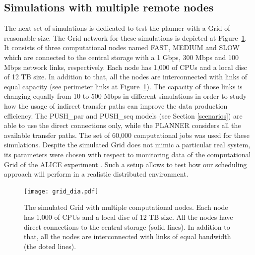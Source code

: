 \documentclass{svjour3}                     %
\begin{document}
\subsection{Simulations with multiple remote nodes}
\label{3nodesSim}
The next set of simulations is dedicated to test the planner with a Grid of reasonable size. The Grid network for these simulations is depicted at Figure~\ref{simulated_grid}. It consists of three computational nodes named FAST, MEDIUM and SLOW which are connected to the central storage with a 1 Gbps, 300 Mbps and 100 Mbps network links, respectively. Each node has 1,000 of CPUs and a local disc of 12 TB size. In addition to that, all the nodes are interconnected with links of equal capacity (see perimeter links at Figure~\ref{simulated_grid}). The capacity of those links is changing equally from 10 to 500 Mbps in different simulations in order to study how the usage of indirect transfer paths can improve the data production efficiency. The PUSH\_par and PUSH\_seq models (see Section \ref{scenarios}) are able to use the direct connections only, while the PLANNER considers all the available transfer paths. The set of 60,000 computational jobs was used for these simulations.
Despite the simulated Grid does not mimic a particular real system, its parameters were chosen with respect to monitoring data of the computational Grid of the ALICE experiment \cite{MonAlisa}. Such a setup allows to test how our scheduling approach will perform in a realistic distributed environment. 
\begin{figure}[b]
  \begin{center}
    \texttt{[image: grid\_dia.pdf]}
    \caption{The simulated Grid with multiple computational nodes. Each node has 1,000 of CPUs and a local disc of 12 TB size. All the nodes have direct connections to the central storage (solid lines). In addition to that, all the nodes are interconnected with links of equal bandwidth (the doted lines).}
    \label{simulated_grid}	
  \end{center}  
\end{figure}
\end{document}

